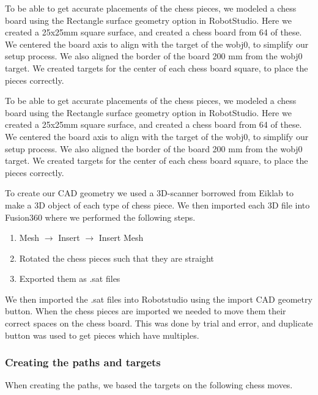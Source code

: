 \documentclass[a4paper,12pt]{article}
\begin{document}
To be able to get accurate placements of the chess pieces, we modeled a chess board using the Rectangle surface geometry option in RobotStudio. Here we created a 25x25mm square surface, and created a chess board from 64 of these. We centered the board axis to align with the target of the wobj0, to simplify our setup process. We also aligned the border of the board 200 mm from the wobj0 target. 
We created targets for the center of each chess board square, to place the pieces correctly. 

To be able to get accurate placements of the chess pieces, we modeled a chess board using the Rectangle surface geometry option in RobotStudio. Here we created a 25x25mm square surface, and created a chess board from 64 of these. We centered the board axis to align with the target of the wobj0, to simplify our setup process. We also aligned the border of the board 200 mm from the wobj0 target. 
We created targets for the center of each chess board square, to place the pieces correctly. 

To create our CAD geometry we used a 3D-scanner borrowed from Eiklab to make a 3D object of each type of chess piece. We then imported each 3D file into Fusion360 where we performed the following steps.
\begin{enumerate}
    \item Mesh $\rightarrow$ Insert $\rightarrow$ Insert Mesh
    \item Rotated the chess pieces such that they are straight
    \item Exported them as .sat files
\end{enumerate}
We then imported the .sat files into Robotstudio using the import CAD geometry button. When the chess pieces are imported we needed to move them their correct spaces on the chess board. This was done by trial and error, and duplicate button was used to get pieces which have multiples.

\subsubsection{Creating the paths and targets}
\label{sec:Challenge_paths_targets}
When creating the paths, we based the targets on the following chess moves.
\end{document}
